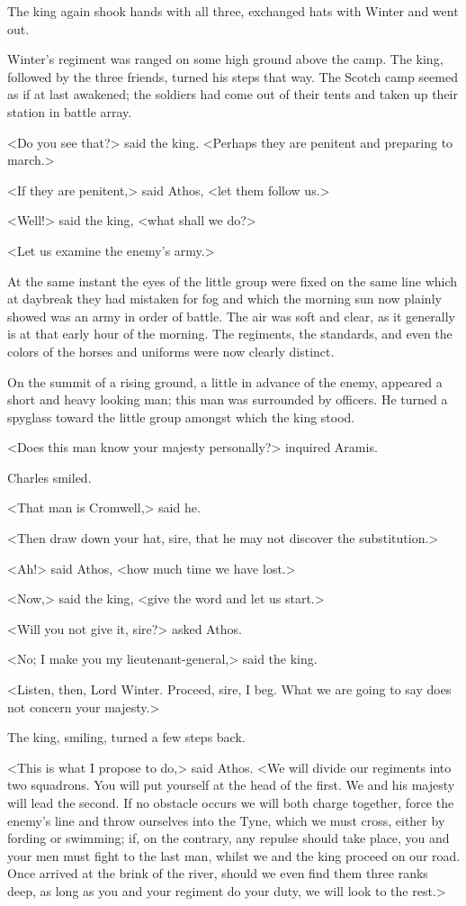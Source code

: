 The king again shook hands with all three, exchanged hats with Winter and went out.

Winter's regiment was ranged on some high ground above the camp. The king, followed by the three friends, turned his steps that way. The Scotch camp seemed as if at last awakened; the soldiers had come out of their tents and taken up their station in battle array.

<Do you see that?> said the king. <Perhaps they are penitent and preparing to march.>

<If they are penitent,> said Athos, <let them follow us.>

<Well!> said the king, <what shall we do?>

<Let us examine the enemy's army.>

At the same instant the eyes of the little group were fixed on the same line which at daybreak they had mistaken for fog and which the morning sun now plainly showed was an army in order of battle. The air was soft and clear, as it generally is at that early hour of the morning. The regiments, the standards, and even the colors of the horses and uniforms were now clearly distinct.

On the summit of a rising ground, a little in advance of the enemy, appeared a short and heavy looking man; this man was surrounded by officers. He turned a spyglass toward the little group amongst which the king stood.

<Does this man know your majesty personally?> inquired Aramis.

Charles smiled.

<That man is Cromwell,> said he.

<Then draw down your hat, sire, that he may not discover the substitution.>

<Ah!> said Athos, <how much time we have lost.>

<Now,> said the king, <give the word and let us start.>

<Will you not give it, sire?> asked Athos.

<No; I make you my lieutenant-general,> said the king.

<Listen, then, Lord Winter. Proceed, sire, I beg. What we are going to say does not concern your majesty.>

The king, smiling, turned a few steps back.

<This is what I propose to do,> said Athos. <We will divide our regiments into two squadrons. You will put yourself at the head of the first. We and his majesty will lead the second. If no obstacle occurs we will both charge together, force the enemy's line and throw ourselves into the Tyne, which we must cross, either by fording or swimming; if, on the contrary, any repulse should take place, you and your men must fight to the last man, whilst we and the king proceed on our road. Once arrived at the brink of the river, should we even find them three ranks deep, as long as you and your regiment do your duty, we will look to the rest.>

